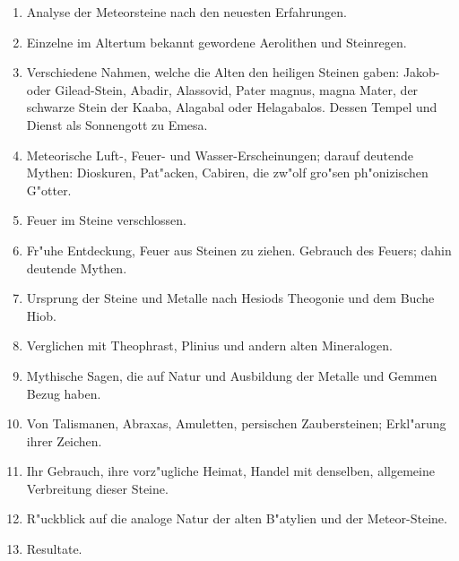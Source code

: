 \documentclass[a4paper, 11pt, oneside, polutonikogreek, german]{article}
\begin{document}
\begin{enumerate}
\begin{enumerate}
        \item Analyse der Meteorsteine nach den neuesten Erfahrungen.
        \item Einzelne im Altertum bekannt gewordene Aerolithen und Steinregen.
        \item Verschiedene Nahmen, welche die Alten den heiligen Steinen gaben: Jakob- oder Gilead-Stein, Abadir, Alassovid, Pater magnus, magna Mater, der schwarze Stein der Kaaba, Alagabal oder Helagabalos. Dessen Tempel und Dienst als Sonnengott zu Emesa.
        \item Meteorische Luft-, Feuer- und Wasser-Erscheinungen; darauf deutende Mythen: Dioskuren, Pat"acken, Cabiren, die zw"olf gro"sen ph"onizischen G"otter.
        \item Feuer im Steine verschlossen.
        \item Fr"uhe Entdeckung, Feuer aus Steinen zu ziehen. Gebrauch des Feuers; dahin deutende Mythen.
        \item Ursprung der Steine und Metalle nach Hesiods Theogonie und dem Buche Hiob.
        \item Verglichen mit Theophrast, Plinius und andern alten Mineralogen.
        \item Mythische Sagen, die auf Natur und Ausbildung der Metalle und Gemmen Bezug haben.
        \item Von Talismanen, Abraxas, Amuletten, persischen Zaubersteinen; Erkl"arung ihrer Zeichen.
        \item Ihr Gebrauch, ihre vorz"ugliche Heimat, Handel mit denselben, allgemeine Verbreitung dieser Steine.
        \item R"uckblick auf die analoge Natur der alten B"atylien und der Meteor-Steine.
        \item Resultate.
    \end{enumerate}
\end{enumerate}
\clearpage
\end{document}
